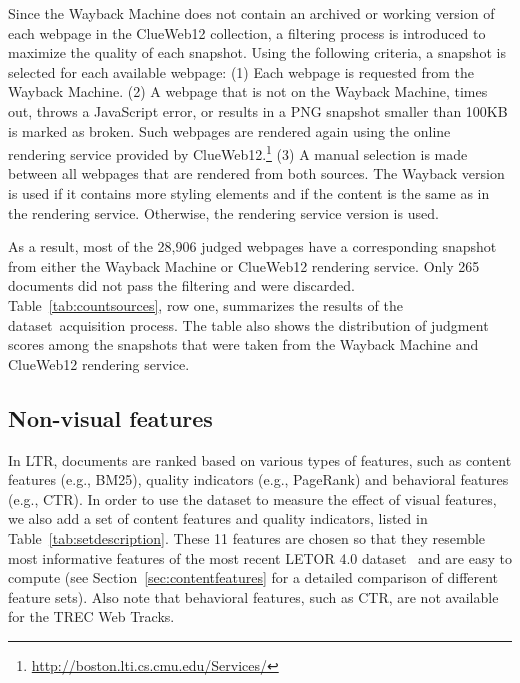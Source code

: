 \label{sec:datasetsum}
Since the Wayback Machine does not contain an archived or working version of each webpage in the ClueWeb12 collection, a filtering process is introduced to maximize the quality of each snapshot. Using the following criteria, a snapshot is selected for each available webpage:
(1) Each webpage is requested from the Wayback Machine. 
(2) A webpage that is not on the Wayback Machine, times out, throws a JavaScript error, or results in a PNG snapshot smaller than 100KB is marked as broken. Such webpages are rendered again using the online rendering service provided by ClueWeb12.\footnote{\url{http://boston.lti.cs.cmu.edu/Services/}}
(3) A manual selection is made between all webpages that are rendered from both sources. The Wayback version is used if it contains more styling elements and if the content is the same as in the rendering service. Otherwise, the rendering service version is used. 

As a result, most of the 28,906 judged webpages have a corresponding snapshot from either the Wayback Machine or ClueWeb12 rendering service.
Only 265 documents did not pass the filtering and were discarded.
Table~\ref{tab:countsources}, row one, summarizes the results of the \datasetname{} dataset~acquisition process. The table also shows the distribution of judgment scores among the snapshots that were taken from the Wayback Machine and ClueWeb12 rendering service.


\subsection{Non-visual features} 
\label{sec:contentfeature}
In LTR, documents are ranked based on various types of features, such as content features (e.g., BM25), quality indicators (e.g., PageRank) and behavioral features (e.g., CTR).
In order to use the \datasetname{} dataset to measure the effect of visual features, we also add a set of content features and quality indicators,
listed in Table~\ref{tab:setdescription}.
These 11 features are chosen so that they resemble most informative features of the most recent LETOR 4.0 dataset~\cite{Qin2013:Introducing} and are easy to compute
(see Section~\ref{sec:contentfeatures} for a detailed comparison of different feature sets).
Also note that behavioral features, such as CTR, are not available for the TREC Web Tracks.


